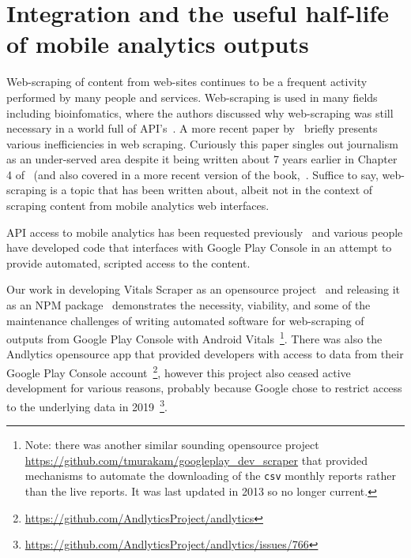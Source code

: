 \section{Integration and the useful half-life of mobile analytics outputs}
Web-scraping of content from web-sites continues to be a frequent activity performed by many people and services. Web-scraping is used in many fields including bioinfomatics, where the authors discussed why web-scraping was still necessary in a world full of API's~\citet{glez2014_web_scraping_in_an_API_world}. A more recent paper by~\citet{diouf2019_web_scraping_state_of_the_art_and_areas_of_application} briefly presents various inefficiencies in web scraping. Curiously this paper singles out journalism as an under-served area despite it being written about 7 years earlier in Chapter 4 of~\citet{gray2012_the_data_journalism_handbook} (and also covered in a more recent version of the book,~\citet[on pages 133, 238]{bounegru2021_the_data_journalism_handbook}. Suffice to say, web-scraping is a topic that has been written about, albeit not in the context of scraping content from mobile analytics web interfaces. 

API access to mobile analytics has been requested previously~\citep{stackoverflow2013_getting_statistics_from_google_play_developer_console_with_an_api} and various people have developed code that interfaces with Google Play Console in an attempt to provide automated, scripted access to the content.

Our work in developing Vitals Scraper as an opensource project~\citep{vitals_scraper_github_package} and releasing it as an NPM package~\citep{vitals_scraper_npm_package} demonstrates the necessity, viability, and some of the maintenance challenges of writing automated software for web-scraping of outputs from Google Play Console with Android Vitals~\footnote{Note: there was another similar sounding opensource project \url{https://github.com/tmurakam/googleplay_dev_scraper} that provided mechanisms to automate the downloading of the \texttt{csv} monthly reports rather than the live reports. It was last updated in 2013 so no longer current.}. There was also the Andlytics opensource app that provided developers with access to data from their Google Play Console account~\footnote{\url{https://github.com/AndlyticsProject/andlytics}}, however this project also ceased active development for various reasons, probably because Google chose to restrict access to the underlying data in 2019~\footnote{\url{https://github.com/AndlyticsProject/andlytics/issues/766}}. %



